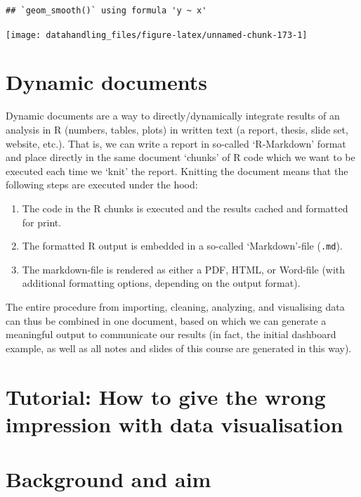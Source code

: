 \documentclass[
  12pt,
]{style/krantz}
\providecommand{\tightlist}{%
  \setlength{\itemsep}{0pt}\setlength{\parskip}{0pt}}
\begin{document}
\begin{verbatim}
## `geom_smooth()` using formula 'y ~ x'
\end{verbatim}

\texttt{[image: datahandling\_files/figure-latex/unnamed-chunk-173-1]}

\hypertarget{dynamic-documents}{%
\section{Dynamic documents}\label{dynamic-documents}}

Dynamic documents are a way to directly/dynamically integrate results of an analysis in R (numbers, tables, plots) in written text (a report, thesis, slide set, website, etc.). That is, we can write a report in so-called `R-Markdown' format and place directly in the same document `chunks' of R code which we want to be executed each time we `knit' the report. Knitting the document means that the following steps are executed under the hood:

\begin{enumerate}
\def\labelenumi{\arabic{enumi}.}
\tightlist
\item
  The code in the R chunks is executed and the results cached and formatted for print.
\item
  The formatted R output is embedded in a so-called `Markdown'-file (\texttt{.md}).
\item
  The markdown-file is rendered as either a PDF, HTML, or Word-file (with additional formatting options, depending on the output format).
\end{enumerate}

The entire procedure from importing, cleaning, analyzing, and visualising data can thus be combined in one document, based on which we can generate a meaningful output to communicate our results (in fact, the initial dashboard example, as well as all notes and slides of this course are generated in this way).

\hypertarget{tutorial-how-to-give-the-wrong-impression-with-data-visualisation}{%
\section{Tutorial: How to give the wrong impression with data visualisation}\label{tutorial-how-to-give-the-wrong-impression-with-data-visualisation}}

\hypertarget{background-and-aim}{%
\section{Background and aim}\label{background-and-aim}}
\end{document}
